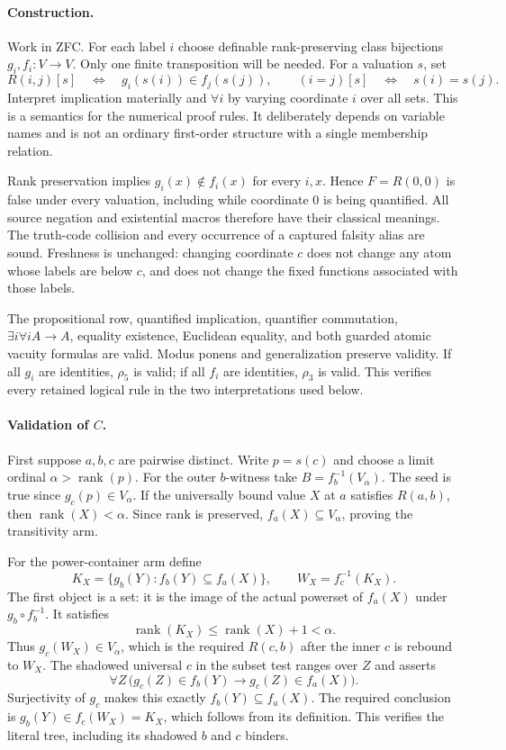 \paragraph{Construction.}
Work in ZFC. For each label $i$ choose definable rank-preserving class
bijections $g_i,f_i:V\to V$. Only one finite transposition will be needed.
For a valuation $s$, set
\[
 R(i,j)[s]\quad\Longleftrightarrow\quad
             g_i(s(i))\in f_j(s(j)),\qquad
 (i=j)[s]\quad\Longleftrightarrow\quad s(i)=s(j).
\]
Interpret implication materially and $\forall i$ by varying coordinate
$i$ over all sets. This is a semantics for the numerical proof rules.
It deliberately depends on variable names and is not an ordinary
first-order structure with a single membership relation.

Rank preservation implies $g_i(x)\notin f_i(x)$ for every $i,x$.
Hence $F=R(0,0)$ is false under every valuation, including while coordinate
$0$ is being quantified. All source negation and existential macros
therefore have their classical meanings. The truth-code collision and
every occurrence of a captured falsity alias are sound. Freshness is
unchanged: changing coordinate $c$ does not change any atom whose labels
are below $c$, and does not change the fixed functions associated with
those labels.

The propositional row, quantified implication, quantifier commutation,
$\exists i\forall i A\to A$, equality existence, Euclidean equality,
and both guarded atomic vacuity formulas are valid. Modus ponens and
generalization preserve validity. If all $g_i$ are identities, $\rho_5$
is valid; if all $f_i$ are identities, $\rho_3$ is valid. This verifies
every retained logical rule in the two interpretations used below.

\paragraph{Validation of $C$.}
First suppose $a,b,c$ are pairwise distinct. Write $p=s(c)$ and choose
a limit ordinal $\alpha>\operatorname{rank}(p)$. For the outer $b$-witness
take $B=f_b^{-1}(V_\alpha)$. The seed is true since
$g_c(p)\in V_\alpha$. If the universally bound value $X$ at $a$ satisfies
$R(a,b)$, then $\operatorname{rank}(X)<\alpha$. Since rank is preserved,
$f_a(X)\subseteq V_\alpha$, proving the transitivity arm.

For the power-container arm define
\[
 K_X=\{g_b(Y):f_b(Y)\subseteq f_a(X)\},\qquad
 W_X=f_c^{-1}(K_X).
\]
The first object is a set: it is the image of the actual powerset of
$f_a(X)$ under $g_b\circ f_b^{-1}$. It satisfies
\[
 \operatorname{rank}(K_X)\leq\operatorname{rank}(X)+1<\alpha.
\]
Thus $g_c(W_X)\in V_\alpha$, which is the required $R(c,b)$ after
the inner $c$ is rebound to $W_X$. The shadowed universal $c$ in the
subset test ranges over $Z$ and asserts
\[
 \forall Z\,\bigl(g_c(Z)\in f_b(Y)\to
                         g_c(Z)\in f_a(X)\bigr).
\]
Surjectivity of $g_c$ makes this exactly $f_b(Y)\subseteq f_a(X)$.
The required conclusion is $g_b(Y)\in f_c(W_X)=K_X$, which follows
from its definition. This verifies the literal tree, including its
shadowed $b$ and $c$ binders.

